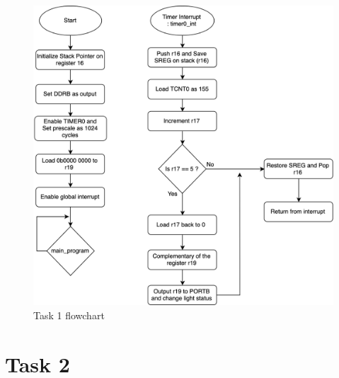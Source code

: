 \documentclass[a4paper,12pt]{article}
\begin{document}
\begin{figure}
\begin{center}
\includegraphics[width=\textwidth/1 ]{flowchart/task1_flowchart.png}
\end{center}
\caption{Task 1 flowchart}
\label{task1}
\end{figure}
\break


\section{Task 2}

\lstset{style=Asm}
\end{document}
